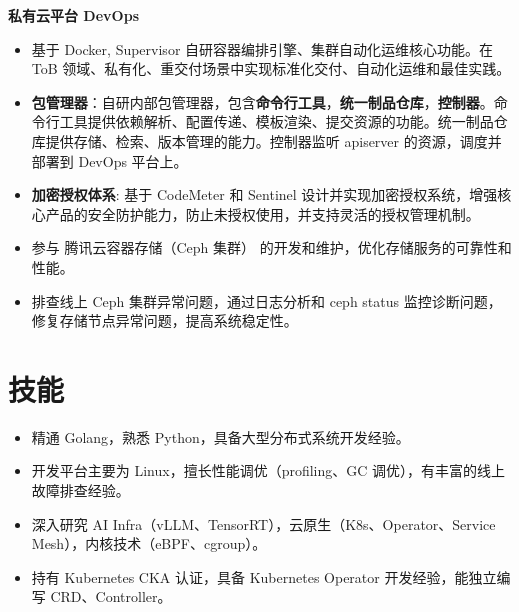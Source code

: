 \documentclass{resume}
\begin{document}
\textbf{私有云平台 DevOps}
\begin{itemize}[parsep=0.5ex]
  \item 基于 Docker, Supervisor 自研容器编排引擎、集群自动化运维核心功能。在 ToB 领域、私有化、重交付场景中实现标准化交付、自动化运维和最佳实践。
  \item \textbf{包管理器}：自研内部包管理器，包含\textbf{命令行工具}，\textbf{统一制品仓库}，\textbf{控制器}。命令行工具提供依赖解析、配置传递、模板渲染、提交资源的功能。统一制品仓库提供存储、检索、版本管理的能力。控制器监听 apiserver 的资源，调度并部署到 DevOps 平台上。
  \item \textbf{加密授权体系}: 基于 CodeMeter 和 Sentinel 设计并实现加密授权系统，增强核心产品的安全防护能力，防止未授权使用，并支持灵活的授权管理机制。
\end{itemize}

\begin{itemize}[parsep=0.5ex]
  \item 参与 腾讯云容器存储（Ceph 集群） 的开发和维护，优化存储服务的可靠性和性能。
  \item 排查线上 Ceph 集群异常问题，通过日志分析和 ceph status 监控诊断问题，修复存储节点异常问题，提高系统稳定性。
\end{itemize}


\section{技能}
\begin{itemize}[parsep=0.5ex]
  \item 精通 Golang，熟悉 Python，具备大型分布式系统开发经验。
  \item 开发平台主要为 Linux，擅长性能调优（profiling、GC 调优），有丰富的线上故障排查经验。
  \item 深入研究 AI Infra（vLLM、TensorRT），云原生（K8s、Operator、Service Mesh），内核技术（eBPF、cgroup）。
  \item 持有 Kubernetes CKA 认证，具备 Kubernetes Operator 开发经验，能独立编写 CRD、Controller。
\end{itemize}
\end{document}
